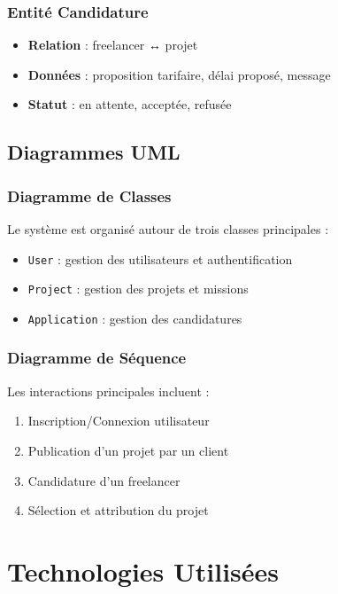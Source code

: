 \documentclass[12pt,a4paper]{article}
\begin{document}
\subsubsection{Entité Candidature}
\begin{itemize}
    \item \textbf{Relation} : freelancer ↔ projet
    \item \textbf{Données} : proposition tarifaire, délai proposé, message
    \item \textbf{Statut} : en attente, acceptée, refusée
\end{itemize}

\subsection{Diagrammes UML}

\subsubsection{Diagramme de Classes}
Le système est organisé autour de trois classes principales :
\begin{itemize}
    \item \texttt{User} : gestion des utilisateurs et authentification
    \item \texttt{Project} : gestion des projets et missions
    \item \texttt{Application} : gestion des candidatures
\end{itemize}

\subsubsection{Diagramme de Séquence}
Les interactions principales incluent :
\begin{enumerate}
    \item Inscription/Connexion utilisateur
    \item Publication d'un projet par un client
    \item Candidature d'un freelancer
    \item Sélection et attribution du projet
\end{enumerate}

\section{Technologies Utilisées}
\end{document}

